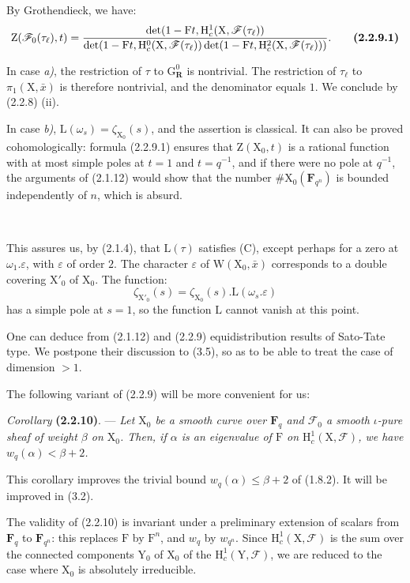 \documentclass[11pt,leqno]{article}
\newcommand{\Page}[1]{\ifvmode\noindent\else\unskip\ \fi{\footnotesize\textcolor{gray}{[p.\,#1]}}\ \ignorespaces}
\begin{document}
By Grothendieck, we have:
\[
\mathrm Z(\mathscr F_0(\tau_\ell),t)
=
\frac{
 \det(1-\mathrm F t,\mathrm H_c^1(\mathrm X,\mathscr F(\tau_\ell))
}{
 \det(1-\mathrm F t,\mathrm H_c^0(\mathrm X,\mathscr F(\tau_\ell))
 \det(1-\mathrm F t,\mathrm H_c^2(\mathrm X,\mathscr F(\tau_\ell)))
}.
\tag*{\textbf{(2.2.9.1)}}
\]

In case \textit{a)}, the restriction of \(\tau\) to \(\mathrm G_{\mathbf R}^0\) is nontrivial. The restriction of \(\tau_\ell\) to \(\pi_1(\mathrm X,\bar{x})\) is therefore nontrivial, and the denominator equals \(1\). We conclude by (2.2.8) (ii).

In case \textit{b)}, \(\mathrm L(\omega_s)=\zeta_{\mathrm X_0}(s)\), and the assertion is classical. It can also be proved cohomologically: formula (2.2.9.1) ensures that \(\mathrm Z(\mathrm X_0,t)\) is a rational function with at most simple poles at \(t=1\) and \(t=q^{-1}\), and if there were no pole at \(q^{-1}\), the arguments of (2.1.12) would show that the number \(\#\mathrm X_0(\mathbf F_{q^n})\) is bounded independently of \(n\), which is absurd.

\Page{196}

This assures us, by (2.1.4), that \(\mathrm L(\tau)\) satisfies (C), except perhaps for a zero at \(\omega_1.\varepsilon\), with \(\varepsilon\) of order \(2\). The character \(\varepsilon\) of \(\mathrm W(\mathrm X_0,\bar{x})\) corresponds to a double covering \(\mathrm X'_0\) of \(\mathrm X_0\). The function:
\[
\zeta_{\mathrm X'_0}(s)=\zeta_{\mathrm X_0}(s).\mathrm L(\omega_s.\varepsilon)
\]
has a simple pole at \(s=1\), so the function \(\mathrm L\) cannot vanish at this point.

One can deduce from (2.1.12) and (2.2.9) equidistribution results of Sato-Tate type. We postpone their discussion to (3.5), so as to be able to treat the case of dimension \(>1\).

The following variant of (2.2.9) will be more convenient for us:

\textit{Corollary} \textbf{(2.2.10)}. — \textit{Let \(\mathrm X_0\) be a smooth curve over \(\mathbf F_q\) and \(\mathscr F_0\) a smooth \(\iota\)-pure sheaf of weight \(\beta\) on \(\mathrm X_0\). Then, if \(\alpha\) is an eigenvalue of \(\mathrm F\) on \(\mathrm H_c^1(\mathrm X,\mathscr F)\), we have \(w_q(\alpha)<\beta+2\).}

This corollary improves the trivial bound \(w_q(\alpha)\leq\beta+2\) of (1.8.2). It will be improved in (3.2).

The validity of (2.2.10) is invariant under a preliminary extension of scalars from \(\mathbf F_q\) to  \(\mathbf F_{q^n}\): this replaces \(\mathrm F\) by \(\mathrm F^n\), and \(w_q\) by  \(w_{q^n}\). Since \(\mathrm H_c^1(\mathrm X,\mathscr F)\) is the sum over the connected components \(\mathrm Y_0\) of \(\mathrm X_0\) of the \(\mathrm H_c^1(\mathrm Y,\mathscr F)\), we are reduced to the case where \(\mathrm X_0\) is absolutely irreducible.
\end{document}
